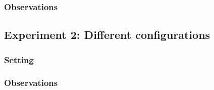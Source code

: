 \documentclass[11pt]{article}
\begin{document}
\subsubsection{Observations}

\subsection{Experiment 2: Different configurations}

\subsubsection{Setting}

\subsubsection{Observations}
\end{document}
